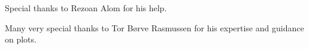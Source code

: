 Special thanks to Rezoan Alom for his help. \cite{nakamura1987}

Many very special thanks to Tor Børve Rasmussen for his expertise and guidance on plots.

